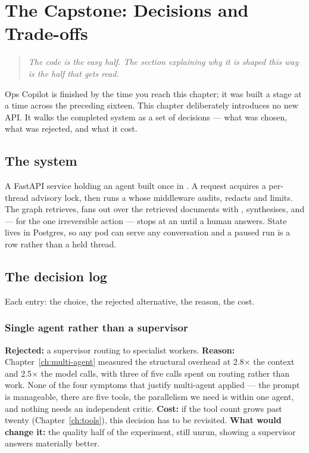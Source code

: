 \chapter{The Capstone: Decisions and Trade-offs}
\label{ch:capstone}

\begin{quote}\itshape
The code is the easy half. The section explaining why it is shaped this way is
the half that gets read.
\end{quote}

\noindent
Ops Copilot is finished by the time you reach this chapter; it was built a stage
at a time across the preceding sixteen. This chapter deliberately introduces no
new API. It walks the completed system as a set of decisions --- what was chosen,
what was rejected, and what it cost.

\section{The system}
\label{sec:capstone-system}


A FastAPI service holding an agent built once in . A request
acquires a per-thread advisory lock, then runs a  whose middleware
audits, redacts and limits. The graph retrieves, fans out over the retrieved
documents with , synthesises, and --- for the one irreversible action ---
stops at an  until a human answers. State lives in Postgres, so
any pod can serve any conversation and a paused run is a row rather than a held
thread.

\section{The decision log}
\label{sec:decisions}

Each entry: the choice, the rejected alternative, the reason, the cost.

\subsection{Single agent rather than a supervisor}

\textbf{Rejected:} a supervisor routing to specialist workers.
\textbf{Reason:} Chapter~\ref{ch:multi-agent} measured the structural overhead at
2.8$\times$ the context and 2.5$\times$ the model calls, with three of five calls
spent on routing rather than work. None of the four symptoms that justify
multi-agent applied --- the prompt is manageable, there are five tools, the
parallelism we need is  within one agent, and nothing needs an
independent critic.
\textbf{Cost:} if the tool count grows past twenty
(Chapter~\ref{ch:tools}), this decision has to be revisited.
\textbf{What would change it:} the quality half of the experiment, still unrun,
showing a supervisor answers materially better.

